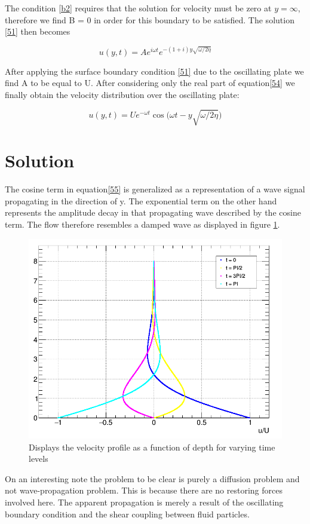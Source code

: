 \documentclass[paper=a4, fontsize=12pt, abstract=on]{scrartcl}
\numberwithin{equation}{section}		%
\numberwithin{figure}{section}			%
\numberwithin{table}{section}				%
\begin{document}
The condition \ref{b2} requires that the solution for velocity must be zero at $y = \infty$, therefore we find B = 0 in order for this boundary to be satisfied. The solution \ref{51} then becomes

\begin{equation}
\label{54}
u(y,t) = Ae^{i\omega t}e^{-(1+i)y\sqrt{\omega/2\eta}}
\end{equation}


After applying the surface boundary condition \ref{51} due to the oscillating plate we find A to be equal to U. After considering only the real part of equation\ref{54} we finally obtain the velocity distribution over the oscillating plate:

\begin{equation}
\label{55}
u(y,t) = Ue^{-\omega t}\cos\Big(\omega t - y\sqrt{\omega/2\eta}\Big)
\end{equation}

\section{Solution}
The cosine term in equation\ref{55} is generalized as a representation of a wave signal propagating in the direction of y. The exponential term on the other hand represents the amplitude decay in that propagating wave described by the cosine term. The flow therefore resembles a damped wave as displayed in figure \ref{q1}. 


\begin{figure}[H]
\centering
\includegraphics[width=0.70\linewidth]{q1}
\caption{Displays the velocity profile as a function of depth for varying time levels}
\label{q1}
\end{figure}

On an interesting note the problem to be clear is purely a diffusion problem and not wave-propagation problem. This is because there are no restoring forces involved here. The apparent propagation is merely a result of the oscillating boundary condition and the shear coupling between fluid particles. 
\end{document}
